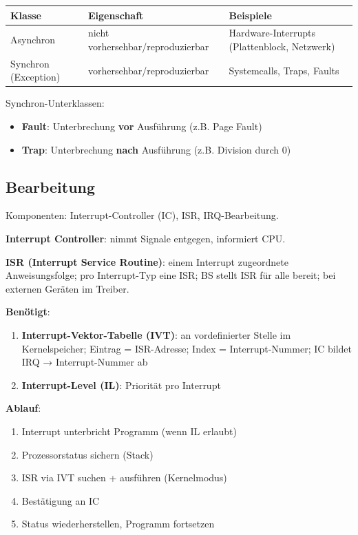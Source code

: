 \documentclass[11pt, a4paper]{article}
\begin{document}
{\small
\begin{tabularx}{\linewidth}{XXX}
\hline
\rowcolor{tableheadbg}
{\color{white}\textbf{Klasse}} & {\color{white}\textbf{Eigenschaft}} & {\color{white}\textbf{Beispiele}} \\[2pt]
\hline
\endhead
\hline
\endfoot
Asynchron & nicht vorhersehbar/reproduzierbar & Hardware-Interrupts (Plattenblock, Netzwerk) \\
Synchron (Exception) & vorhersehbar/reproduzierbar & Systemcalls, Traps, Faults \\
\end{tabularx}
}


Synchron-Unterklassen:

\begin{itemize}
  \item \textbf{Fault}: Unterbrechung \textbf{vor} Ausführung (z.B. Page Fault)
  \item \textbf{Trap}: Unterbrechung \textbf{nach} Ausführung (z.B. Division durch 0)
\end{itemize}


\subsection{Bearbeitung}

Komponenten: Interrupt-Controller (IC), ISR, IRQ-Bearbeitung.


\textbf{Interrupt Controller}: nimmt Signale entgegen, informiert CPU.


\textbf{ISR (Interrupt Service Routine)}: einem Interrupt zugeordnete Anweisungsfolge; pro Interrupt-Typ eine ISR; BS stellt ISR für alle bereit; bei externen Geräten im Treiber.


\textbf{Benötigt}:

\begin{enumerate}
  \item \textbf{Interrupt-Vektor-Tabelle (IVT)}: an vordefinierter Stelle im Kernelspeicher; Eintrag = ISR-Adresse; Index = Interrupt-Nummer; IC bildet IRQ → Interrupt-Nummer ab
  \item \textbf{Interrupt-Level (IL)}: Priorität pro Interrupt
\end{enumerate}

\textbf{Ablauf}:

\begin{enumerate}
  \item Interrupt unterbricht Programm (wenn IL erlaubt)
  \item Prozessorstatus sichern (Stack)
  \item ISR via IVT suchen + ausführen (Kernelmodus)
  \item Bestätigung an IC
  \item Status wiederherstellen, Programm fortsetzen
\end{enumerate}
\end{document}
